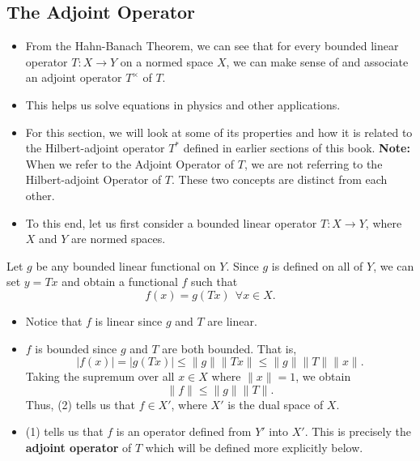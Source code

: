 \subsection{The Adjoint Operator}

\begin{itemize}
    \item From the Hahn-Banach Theorem, we can see that for every bounded linear operator \( T: X \to Y  \) on a normed space \( X  \), we can make sense of and associate an adjoint operator \( T^{\times} \) of \( T  \). 
    \item This helps us solve equations in physics and other applications.
    \item For this section, we will look at some of its properties and how it is related to the Hilbert-adjoint operator \( T^{*} \) defined in earlier sections of this book. \textbf{Note:} When we refer to the Adjoint Operator of \( T  \), we are not referring to the Hilbert-adjoint Operator of \( T  \). These two concepts are distinct from each other. 
    \item To this end, let us first consider a bounded linear operator \( T : X \to Y  \), where \( X  \) and \( Y  \) are normed spaces.
\end{itemize}

Let \( g  \) be any bounded linear functional on \( Y  \). Since \( g  \) is defined on all of \( Y  \), we can set \( y = Tx  \) and obtain a functional \( f  \) such that 
\begin{equation}  f(x) = g(Tx) \ \ \forall x \in X. \tag{1}  \end{equation}
\begin{itemize}
    \item Notice that \( f  \) is linear since \( g  \) and \( T  \) are linear. 
    \item \( f  \) is bounded since \( g  \) and \( T  \) are both bounded. That is, 
        \[  | f(x) |  = | g (Tx) |  \leq \|g \| \| Tx \| \leq \|g \| \|T \| \|x \|.    \]
        Taking the supremum over all \( x \in X  \) where \( \|x \| = 1  \), we obtain
        \[  \|f\| \leq \|g \| \|T\|. \tag{2} \]
        Thus, (2) tells us that \( f \in X' \), where \( X' \) is the dual  space of \( X  \). 
    \item (1) tells us that \( f  \) is an operator defined from \( Y' \) into \( X' \). This is precisely the \textbf{adjoint operator} of \( T \) which will be defined more explicitly below. 
\end{itemize}

